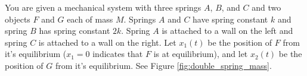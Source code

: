 \begin{problem}
    You are given a mechanical system with three springs $A$, $B$, and $C$ and two
    objects $F$ and $G$ each of mass $M$.  Springs $A$ and $C$ have spring constant
    $k$ and spring $B$ has spring constant $2k$.  Spring $A$ is attached to a wall on
    the left and spring $C$ is attached to a wall on the right. Let $x_1(t)$ be the
    position of $F$ from it's equilibrium ($x_1=0$ indicates that $F$ is at
    equilibrium), and let $x_2(t)$ be the position of $G$ from it's equilibrium.  See
    Figure \ref{fig:double_spring_mass}.
    \begin{figure}[ht!]
        \begin{center}
\end{center}
\end{figure}
\end{problem}

